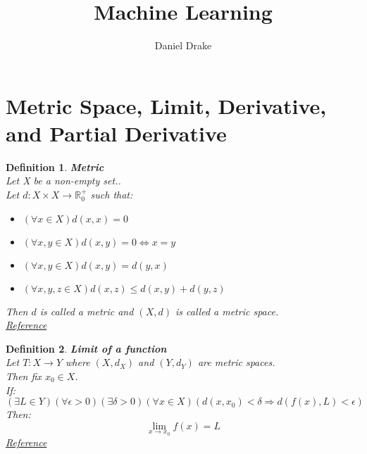 \documentclass[12pt]{extarticle}
\title{Machine Learning}
\author{Daniel Drake}
\theoremstyle{plain}
\theoremstyle{Definition}
\newtheorem{def.}{Definition}[section]
\theoremstyle{Definition}
\theoremstyle{plain}
\begin{document}
		\maketitle			
\section{Metric Space, Limit, Derivative, and Partial Derivative}
\begin{def.} \textbf{Metric} \\ 
	Let X be a non-empty set.. \\ 
	Let $d : X \times X \to \mathbb{R}^+_0$ such that: 
	\begin{itemize}
		\item $(\forall x \in X) d(x,x) = 0$
		\item $(\forall x,y \in X) d(x,y) = 0 \Leftrightarrow x = y$ 
		\item $(\forall x,y \in X) d(x,y) = d(y,x)$
		\item $(\forall x,y,z \in X) d(x,z) \leq d(x,y) + d(y,z)$
	\end{itemize}	
	Then $d$ is called a metric and $(X,d)$ is called a metric space. \\
	\href{https://en.wikipedia.org/wiki/Metric_space}{Reference}
\end{def.}
\begin{def.} \textbf{Limit of a function} \\ 
	Let $T : X \to Y$ where $(X,d_X)$ and $(Y,d_Y)$ are metric spaces. \\ 
	Then fix $x_0 \in X$. \\
	If:
	$$(\exists L \in Y)( \forall \epsilon > 0 )(\exists \delta > 0)(\forall x \in X)(d(x,x_0) < \delta \Rightarrow d(f(x),L) < \epsilon)$$
	Then: $$\lim_{x \to x_0} f(x) = L$$ 
	\href{https://en.wikipedia.org/wiki/Limit_of_a_function}{Reference}
\end{def.}
\end{document}
